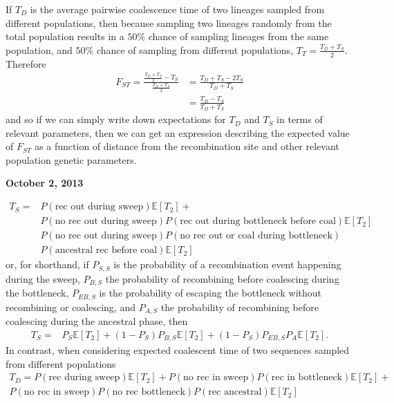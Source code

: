 \documentclass[reqno]{amsart}
\begin{document}
If $T_D$ is the average pairwise coalescence time of two lineages sampled from different populations, then because sampling two lineages randomly from the total population results in a $50\%$ chance of sampling lineages from the same population, and $50\%$ chance of sampling from different populations, $T_T = \frac{T_D + T_S}{2}$. Therefore
\begin{align}
	F_{ST} = \frac{\frac{T_D+T_S}{2} - T_S}{\frac{T_D+T_S}{2}} &= \frac{T_D+T_S - 2T_S}{T_D+T_S} \\
	&= \frac{T_D - T_S}{T_D + T_S}
\end{align}
and so if we can simply write down expectations for $T_D$ and $T_S$ in terms of relevant parameters, then we can get an expression describing the expected value of $F_{ST}$ as a function of distance from the recombination site and other relevant population genetic parameters.
\begin{flushright}
	\textbf{October 2, 2013}
\end{flushright}
\begin{align}
	T_S = &P(\text{rec out during sweep}) \mathbb{E}[T_2] + \\
	&P(\text{no rec out during sweep})P(\text{rec out during bottleneck before coal})\mathbb{E}[T_2] \\
	&P(\text{no rec out during sweep})P(\text{no rec out or coal during bottleneck})\\&P(\text{ancestral rec before coal})\mathbb{E}[T_2]
\end{align}
or, for shorthand, if $P_{S,S}$ is the probability of a recombination event happening during the sweep, $P_{B,S}$ the probability of recombining before coalescing during the bottleneck, $P_{EB,S}$ is the probability of escaping the bottleneck without recombining or coalescing, and $P_{A,S}$ the probability of recombining before coalescing during the ancestral phase, then
\begin{align}
	T_S = &P_{S} \mathbb{E}[T_2] + (1-P_{S})P_{B,S}\mathbb{E}[T_2] + (1-P_{S})P_{EB,S}P_{A}\mathbb{E}[T_2].
\end{align}
In contrast, when considering expected coalescent time of two sequences sampled from different populations
\begin{align}
	T_D = P(\text{rec during sweep})\mathbb{E}[T_2] + P(\text{no rec in sweep})P(\text{rec in bottleneck})\mathbb{E}[T_2] +\\
	P(\text{no rec in sweep})P(\text{no rec bottleneck})P(\text{rec ancestral})\mathbb{E}[T_2]
\end{align}
\end{document}
